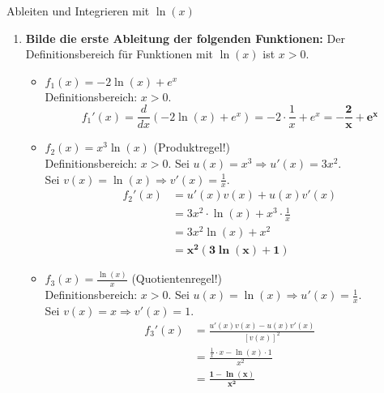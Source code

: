 \begin{loesungsumgebung}{Ableiten und Integrieren mit \texorpdfstring{$\ln(x)$}{ln(x)}}

\begin{enumerate}[label=(\alph*)]
    \item \textbf{Bilde die erste Ableitung der folgenden Funktionen:}
    Der Definitionsbereich für Funktionen mit $\ln(x)$ ist $x>0$.
    \begin{itemize}
        \item \textbf{$f_1(x) = -2\ln(x) + e^x$} \\
        Definitionsbereich: $x>0$.
        $$ f_1'(x) = \frac{d}{dx}(-2\ln(x) + e^x) = -2 \cdot \frac{1}{x} + e^x = \mathbf{-\frac{2}{x} + e^x} $$

        \item \textbf{$f_2(x) = x^3 \ln(x)$} (Produktregel!) \\
        Definitionsbereich: $x>0$.
        Sei $u(x) = x^3 \Rightarrow u'(x) = 3x^2$. \\
        Sei $v(x) = \ln(x) \Rightarrow v'(x) = \frac{1}{x}$.
        \begin{align*}
        f_2'(x) &= u'(x)v(x) + u(x)v'(x) \\
                &= 3x^2 \cdot \ln(x) + x^3 \cdot \frac{1}{x} \\
                &= 3x^2 \ln(x) + x^2 \\
                &= \mathbf{x^2(3\ln(x) + 1)}
        \end{align*}

        \item \textbf{$f_3(x) = \frac{\ln(x)}{x}$} (Quotientenregel!) \\
        Definitionsbereich: $x>0$.
        Sei $u(x) = \ln(x) \Rightarrow u'(x) = \frac{1}{x}$. \\
        Sei $v(x) = x \Rightarrow v'(x) = 1$.
        \begin{align*}
        f_3'(x) &= \frac{u'(x)v(x) - u(x)v'(x)}{[v(x)]^2} \\
                &= \frac{\frac{1}{x} \cdot x - \ln(x) \cdot 1}{x^2} \\
                &= \mathbf{\frac{1 - \ln(x)}{x^2}}
        \end{align*}
    \end{itemize}


\end{enumerate}
\end{loesungsumgebung}
